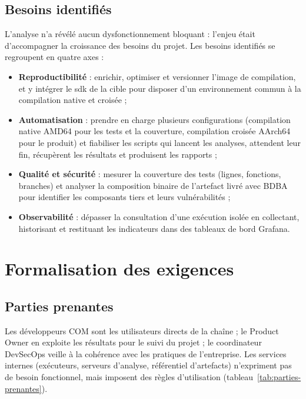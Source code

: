 \subsection{Besoins identifiés}

L'analyse n'a révélé aucun dysfonctionnement bloquant : l'enjeu était
d'accompagner la croissance des besoins du projet. Les besoins identifiés se
regroupent en quatre axes :

\begin{itemize}[nosep]
  \item \textbf{Reproductibilité} : enrichir, optimiser et versionner l'image de
        compilation, et y intégrer le \gls{sdk} de la cible pour disposer d'un
        environnement commun à la compilation native et croisée ;
  \item \textbf{Automatisation} : prendre en charge plusieurs configurations
        (compilation native AMD64 pour les tests et la couverture, compilation
        croisée AArch64 pour le produit) et fiabiliser les scripts qui lancent
        les analyses, attendent leur fin, récupèrent les résultats et produisent
        les rapports ;
  \item \textbf{Qualité et sécurité} : mesurer la couverture des tests (lignes,
        fonctions, branches) et analyser la composition binaire de l'artefact
        livré avec BDBA pour identifier les composants tiers et leurs
        vulnérabilités ;
  \item \textbf{Observabilité} : dépasser la consultation d'une exécution
        isolée en collectant, historisant et restituant les indicateurs dans des
        tableaux de bord Grafana.
\end{itemize}

\section{Formalisation des exigences}
\label{sec:bes-exigences}

\subsection{Parties prenantes}

Les développeurs COM sont les utilisateurs directs de la chaîne ; le Product
Owner en exploite les résultats pour le suivi du projet ; le coordinateur
DevSecOps veille à la cohérence avec les pratiques de l'entreprise. Les services
internes (exécuteurs, serveurs d'analyse, référentiel d'artefacts) n'expriment
pas de besoin fonctionnel, mais imposent des règles d'utilisation
(tableau~\ref{tab:parties-prenantes}).

